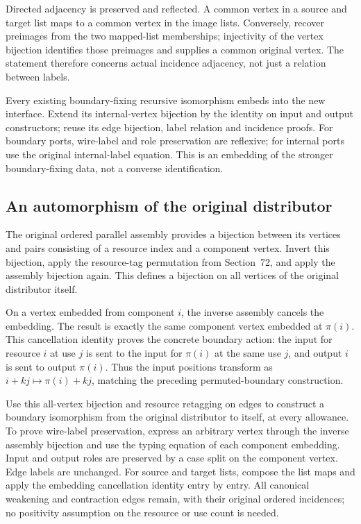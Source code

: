 Directed adjacency is preserved and reflected. A common vertex in a source
and target list maps to a common vertex in the image lists. Conversely,
recover preimages from the two mapped-list memberships; injectivity of the
vertex bijection identifies those preimages and supplies a common original
vertex. The statement therefore concerns actual incidence adjacency, not
just a relation between labels.

Every existing boundary-fixing recursive isomorphism embeds into the new
interface. Extend its internal-vertex bijection by the identity on input and
output constructors; reuse its edge bijection, label relation and incidence
proofs. For boundary ports, wire-label and role preservation are reflexive;
for internal ports use the original internal-label equation. This is an
embedding of the stronger boundary-fixing data, not a converse identification.

\subsection{An automorphism of the original distributor}
The original ordered parallel assembly provides a bijection between its
vertices and pairs consisting of a resource index and a component vertex.
Invert this bijection, apply the resource-tag permutation from Section~72,
and apply the assembly bijection again. This defines a bijection on all
vertices of the original distributor itself.

On a vertex embedded from component $i$, the inverse assembly cancels the
embedding. The result is exactly the same component vertex embedded at
$\pi(i)$. This cancellation identity proves the concrete boundary action:
the input for resource $i$ at use $j$ is sent to the input for $\pi(i)$ at the
same use $j$, and output $i$ is sent to output $\pi(i)$. Thus the input
positions transform as $i+kj\mapsto\pi(i)+kj$, matching the preceding
permuted-boundary construction.

Use this all-vertex bijection and resource retagging on edges to construct
a boundary isomorphism from the original distributor to itself, at every
allowance. To prove wire-label preservation, express an arbitrary vertex
through the inverse assembly bijection and use the typing equation of each
component embedding. Input and output roles are preserved by a case split on
the component vertex. Edge labels are unchanged. For source and target lists,
compose the list maps and apply the embedding cancellation identity entry
by entry. All canonical weakening and contraction edges remain, with their
original ordered incidences; no positivity assumption on the resource or
use count is needed.

